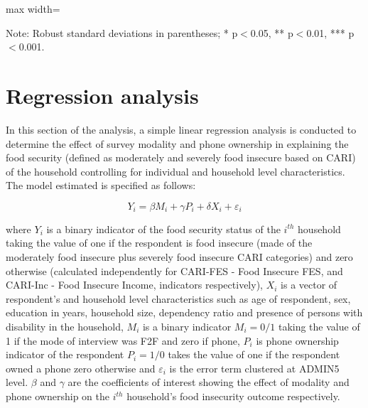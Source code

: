 \documentclass[11pt,harvard]{article}
\begin{document}
	\begin{table}[htbp]
		\centering
		\begin{adjustbox}{max width=\textwidth}
			\begin{threeparttable}
				\caption{Impact of Survey Modality on Income}
				\scriptsize%
				 
				\label{tab:INC_Modality_BF}
				\begin{tablenotes}
					\item Note: Robust standard deviations in parentheses; * p$<$0.05, ** p$<$0.01, *** p$<$0.001.
				\end{tablenotes}
			\end{threeparttable}
		\end{adjustbox}
	\end{table}
	
	
	
	
	

	\pagebreak
	
	
	\section{Regression analysis}
	
	In this section of the analysis, a simple linear regression analysis is conducted to determine the effect of survey modality and phone ownership in explaining the food security (defined as moderately and severely food insecure based on CARI) of the household controlling for individual and household level characteristics. The model estimated is specified as follows:
	
	\[Y_{i}=\beta M_{i}+ \gamma P_{i}+ \delta X_{i}+ \varepsilon_{i} \tag{1}\] 
	
	where \(Y_{i}\) is a binary indicator of the food security status of the \(i^{th}\) household taking the value of one if the respondent is food insecure (made of the moderately food insecure plus severely food insecure CARI categories) and zero otherwise (calculated independently for CARI-FES - Food Insecure FES, and CARI-Inc - Food Insecure Income, indicators respectively), \(X_{i}\) is a vector of respondent's and household level characteristics such as age of respondent, sex, education in years, household size, dependency ratio and presence of persons with disability in the household, \(M_{i}\) is a binary indicator \(M_{i}=0/1\) taking the value of 1 if the mode of interview was F2F and zero if  phone, \(P_{i}\) is phone ownership indicator of the respondent \(P_{i}=1/0\) takes the value of one if the respondent owned a phone zero otherwise and \(\varepsilon_{i}\) is the error term clustered at ADMIN5 level. \(\beta\) and \(\gamma\) are the coefficients of interest showing the effect of modality and phone ownership on the \(i^{th}\) household's food insecurity outcome respectively.
	
\end{document}
